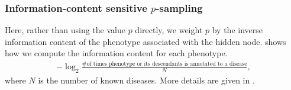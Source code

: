 \subsubsection{Information-content sensitive $p$-sampling}
\label{subsubsec:icsampmodel}
%
Here, rather than using the value $p$ directly, we weight 
$p$ by the inverse information content of the phenotype
associated with the hidden node.  shows how
we compute the information content for each phenotype.
%
\begin{align}\label{eq:infocontent} 
    -\log_{2}\frac{\text{\# of times phenotype or its descendants is annotated to a disease}}{N},
\end{align}
where $N$ is the number of known diseases.
%
More details are given in .
